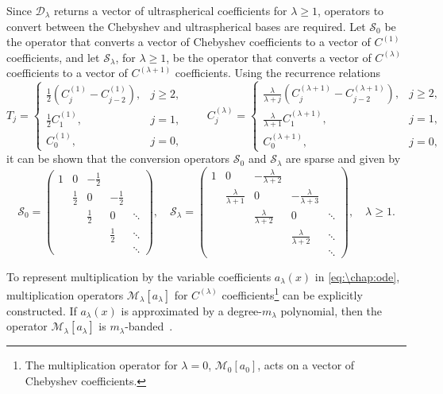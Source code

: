 Since $\mathcal{D}_\lambda$ returns a vector of ultraspherical coefficients for $\lambda\geq1$, operators to convert between the Chebyshev and ultraspherical bases are required. Let $\mathcal{S}_0$ be the operator that converts a vector of Chebyshev coefficients to a vector of $C^{(1)}$ coefficients, and let $\mathcal{S}_\lambda$, for $\lambda \geq 1$, be the operator that converts a vector of $C^{(\lambda)}$ coefficients to a vector of $C^{(\lambda+1)}$ coefficients. Using the recurrence relations~\cite[(18.9.7) \& (18.9.9)]{NISTHandbook}
\[
T_j = \begin{cases}
\tfrac{1}{2}\left(C_j^{(1)}-C_{j-2}^{(1)}\right), & j\geq 2, \\[0.4em]
\tfrac{1}{2}C_1^{(1)}, & j = 1, \\[0.3em]
C_0^{(1)}, & j = 0,
\end{cases}
\qquad
C_j^{(\lambda)} = \begin{cases}
\tfrac{\lambda}{\lambda+j} \left(C_{j}^{(\lambda+1)}-C_{j-2}^{(\lambda+1)}\right), & j\geq 2, \\[0.4em]
\tfrac{\lambda}{\lambda+1} C_1^{(\lambda+1)}, & j = 1, \\[0.3em]
C_0^{(\lambda+1)}, & j = 0,
\end{cases}
\]
it can be shown that the conversion operators $\mathcal{S}_0$ and $\mathcal{S}_\lambda$ are sparse and given by~\cite{Olver_13_01}
\[
\mathcal{S}_0 = \begin{pmatrix}
1 & 0 & -\frac12 \\[0.5em]
& \frac12 & 0 & -\frac12 \\
&& \frac12 & 0 & \ddots \\
&&& \frac12 & \ddots \\
&&&& \ddots
\end{pmatrix}, \quad
\mathcal{S}_\lambda = \begin{pmatrix}
1 & 0 & -\frac{\lambda}{\lambda+2} \\[0.5em]
& \frac{\lambda}{\lambda+1} & 0 & -\frac{\lambda}{\lambda+3} \\
&& \frac{\lambda}{\lambda+2} & 0 & \ddots \\
&&& \frac{\lambda}{\lambda+2} & \ddots \\
&&&& \ddots
\end{pmatrix},
\quad \lambda \geq 1.
\]

To represent multiplication by the variable coefficients $a_\lambda(x)$ in \cref{eq:\chap:ode}, multiplication operators $\mathcal{M}_\lambda[a_\lambda]$ for $C^{(\lambda)}$ coefficients\footnote{The multiplication operator for $\lambda = 0$, $\mathcal{M}_0[a_0]$, acts on a vector of Chebyshev coefficients.} can be explicitly constructed. If $a_\lambda(x)$ is approximated by a degree-$m_\lambda$ polynomial, then the operator $\mathcal{M}_\lambda[a_\lambda]$ is $m_\lambda$-banded~\cite{Olver_13_01}.

